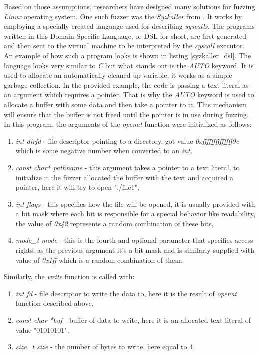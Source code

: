 Based on those assumptions, researchers have designed many solutions for fuzzing \textit{Linux} operating system. One such fuzzer was the \textit{Syzkaller} from \cite{syzkaller}. It works by employing a specially created language used for describing \textit{syscalls}. The programs written in this Domain Specific Language, or DSL for short, are first generated and then sent to the virtual machine to be interpreted by the \textit{syscall} executor. An example of how such a program looks is shown in listing \ref{syzkaller_dsl}. The language looks very similar to \textit{C} but what stands out is the \textit{AUTO} keyword. It is used to allocate an automatically cleaned-up variable, it works as a simple garbage collection. In the provided example, the code is passing a text literal as an argument which requires a pointer. That is why the \textit{AUTO} keyword is used to allocate a buffer with some data and then take a pointer to it. This mechanism will ensure that the buffer is not freed until the pointer is in use during fuzzing. In this program, the arguments of the \textit{openat} function were initialized as follows:
\begin{enumerate}
    \item \textit{int dirfd} - file descriptor pointing to a directory, got value \textit{0xffffffffffffff9c} which is some negative number when converted to an \textit{int},
    \item \textit{const char* pathname} - this argument takes a pointer to a text literal, to initialize it the fuzzer allocated the buffer with the text and acquired a pointer, here it will try to open "./file1",
    \item \textit{int flags} - this specifies how the file will be opened, it is usually provided with a bit mask where each bit is responsible for a special behavior like readability, the value of \textit{0x42} represents a random combination of these bits,
    \item \textit{mode\_t mode} - this is the fourth and optional parameter that specifies access rights, as the previous argument it's a bit mask and is similarly supplied with value of \textit{0x1ff} which is a random combination of them.
\end{enumerate}
Similarly, the \textit{write} function is called with:
\begin{enumerate}
    \item \textit{int fd} - file descriptor to write the data to, here it is the result of \textit{openat} function described above,
    \item \textit{const char *buf} - buffer of data to write, here it is an allocated text literal of value "01010101",
    \item \textit{size\_t size} - the number of bytes to write, here equal to 4.
\end{enumerate}

